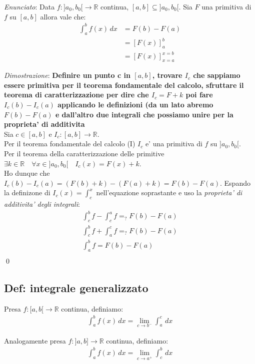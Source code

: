 \documentclass{article}
\begin{document}
\emph{Enunciato}: Data $f: ]a_0, b_0[ \to \mathbb{R}$ continua, $[a, b] \subseteq ]a_0, b_0[$.
Sia $F$ una primitiva di $f$ su $[a, b]$ allora vale che:
\begin{align*}
  \int_a^b f(x) \, dx &= F(b) - F(a) \\
  &= [F(x)]_a^b \\
  &= [F(x)]_{x=a}^{x=b}
\end{align*}

\noindent \emph{Dimostrazione}: \textbf{Definire un punto c in $[a,b]$, trovare
$I_c$ che sappiamo essere primitiva per il teorema fondamentale del calcolo,
sfruttare il teorema di caratterizzazione per dire che $I_c = F + k$ poi fare
$I_c(b) - I_c(a)$ applicando le definizioni (da un lato abremo $F(b) - F(a)$ e
dall'altro due integrali che possiamo unire per la proprieta' di additivita} \\
Sia $c \in [a, b]$ e $I_c: [a, b] \to \mathbb{R}$. \\
Per il teorema fondamentale del calcolo (I) $I_c$ e' una primitiva di $f$ su $]a_0, b_0[$.\\
Per il teorema della caratterizzazione delle primitive $\exists k \in \mathbb{R}
\quad \forall x \in ]a_0, b_0[ \quad I_c(x) = F(x) + k$. \\
Ho dunque che $I_c(b) - I_c(a) = (F(b) + k) - (F(a) + k) = F(b) - F(a)$.
Espando la definizone di $I_c(x) = \int_c^x$ nell'equazione soprastante e uso la
\emph{proprieta' di additivita' degli integrali}:
\begin{align*}
  \int_c^b f - \int_c^a f =_? F(b) - F(a) \\
  \int_c^b f + \int_a^c f =_? F(b) - F(a) \\
  \int_a^b f = F(b) - F(a) \\
\end{align*}
\qed

\subsection{Def: integrale generalizzato}

Presa $f: [a, b[ \to \mathbb{R}$ continua, definiamo:
\begin{align*}
  \int_a^b f(x) \, dx = \lim_{c \to b^-} \int_a^c \, dx
\end{align*}

\noindent Analogamente presa $f: ]a, b] \to \mathbb{R}$ continua, definiamo:
\begin{align*}
  \int_a^b f(x) \, dx = \lim_{c \to a^+} \int_c^b \, dx
\end{align*}
\end{document}
